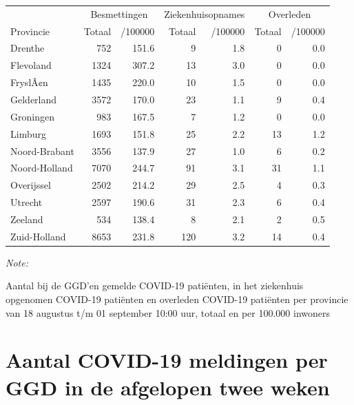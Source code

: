\documentclass[
  english,
  man,floatsintext]{apa6}
\begin{document}
\begin{table}
\centering
\begin{threeparttable}
\begin{tabular}{lrrrrrr}
\toprule
\multicolumn{1}{c}{ } & \multicolumn{2}{c}{Besmettingen} & \multicolumn{2}{c}{Ziekenhuisopnames} & \multicolumn{2}{c}{Overleden} \\
\cmidrule(l{3pt}r{3pt}){2-3} \cmidrule(l{3pt}r{3pt}){4-5} \cmidrule(l{3pt}r{3pt}){6-7}
Provincie & Totaal & /100000 & Totaal & /100000 & Totaal & /100000\\
\midrule
Drenthe & 752 & 151.6 & 9 & 1.8 & 0 & 0.0\\
Flevoland & 1324 & 307.2 & 13 & 3.0 & 0 & 0.0\\
FryslÃ¢n & 1435 & 220.0 & 10 & 1.5 & 0 & 0.0\\
Gelderland & 3572 & 170.0 & 23 & 1.1 & 9 & 0.4\\
Groningen & 983 & 167.5 & 7 & 1.2 & 0 & 0.0\\
Limburg & 1693 & 151.8 & 25 & 2.2 & 13 & 1.2\\
Noord-Brabant & 3556 & 137.9 & 27 & 1.0 & 6 & 0.2\\
Noord-Holland & 7070 & 244.7 & 91 & 3.1 & 31 & 1.1\\
Overijssel & 2502 & 214.2 & 29 & 2.5 & 4 & 0.3\\
Utrecht & 2597 & 190.6 & 31 & 2.3 & 6 & 0.4\\
Zeeland & 534 & 138.4 & 8 & 2.1 & 2 & 0.5\\
Zuid-Holland & 8653 & 231.8 & 120 & 3.2 & 14 & 0.4\\
\bottomrule
\end{tabular}
\begin{tablenotes}
\item \textit{Note: } 
\item Aantal bij de GGD’en gemelde COVID-19 patiënten, in het ziekenhuis opgenomen COVID-19 patiënten en overleden COVID-19 patiënten per provincie van 18 augustus t/m 01 september 10:00 uur, totaal en per 100.000 inwoners
\end{tablenotes}
\end{threeparttable}
\end{table}

\newpage

\hypertarget{aantal-covid-19-meldingen-per-ggd-in-de-afgelopen-twee-weken}{%
\section{Aantal COVID-19 meldingen per GGD in de afgelopen twee weken}\label{aantal-covid-19-meldingen-per-ggd-in-de-afgelopen-twee-weken}}
\end{document}
